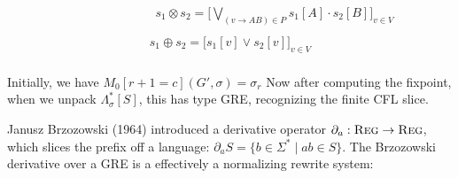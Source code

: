 \documentclass[portrait,a0b,final,a4resizeable]{a0poster}
\def\jointspacing{\vspace{0.3in}}
\begin{document}
\begin{poster}
\begin{multicols}{2}
\vspace{-2cm}
\setlength{\columnseprule}{0pt}
\setlength{\columnsep}{-2cm}
\begin{multicols}{2}
\begin{eqnarray*}
\hspace{3cm}s_1\otimes s_2 = \Big[\bigvee_{(v \rightarrow AB) \in P} s_1[A] \cdot s_2[B] \Big]_{v \in V} \\
\end{eqnarray*} \break\vspace{-0.45cm}
\begin{eqnarray*}
s_1\oplus s_2 = \big[s_1[v] \vee s_2[v]\big]_{v \in V} \\
\end{eqnarray*}
\end{multicols}

\hspace*{2cm}\begin{minipage}[c]{0.90\columnwidth}
Initially, we have $M_0[r+1=c](G', \sigma) = {\sigma_r}$
Now after computing the fixpoint, when we unpack $\Lambda^*_\sigma[S]$, this has type GRE, recognizing the finite CFL slice.
\end{minipage}

\jointspacing


      \jointspacing

      \hspace*{2cm}\begin{minipage}[c]{0.90\columnwidth}
Janusz Brzozowski (1964) introduced a derivative operator $\partial_a: \textsc{Reg} \rightarrow \textsc{Reg}$, which slices the prefix off a language: $\partial_a S = \{b \in \Sigma^* \mid ab \in S\}$. The Brzozowski derivative over a GRE is a effectively a normalizing rewrite system:
      \end{minipage}


\end{multicols}
\end{poster}
\end{document}
